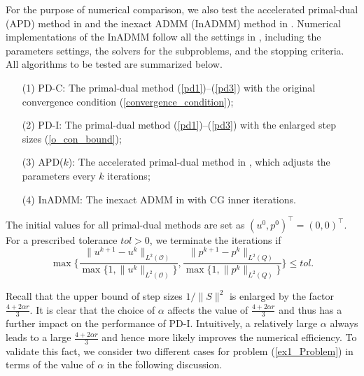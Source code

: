 \documentclass[final]{siamart171218}
\theoremstyle{remark}
\begin{document}
For the purpose of numerical comparison, we also test the accelerated primal-dual (APD) method in \cite{chambolle2011first} and the inexact ADMM (InADMM) method in  \cite{glowinski2022}.
Numerical implementations of the InADMM follow all the settings in \cite{glowinski2022}, including the parameters settings, the solvers for the subproblems, and the stopping criteria. All algorithms to be tested are summarized below.
\begin{enumerate}
	\item [(1)] PD-C: The primal-dual method (\ref{pd1})--(\ref{pd3}) with the original convergence condition (\ref{convergence_condition});
	\item [(2)] PD-I: The primal-dual method (\ref{pd1})--(\ref{pd3}) with the enlarged step sizes (\ref{o_con_bound});
	\item [(3)] {APD($k$)}: The accelerated primal-dual method in \cite{chambolle2011first}, which adjusts the parameters every $k$ iterations;
	\item [(4)] {InADMM}: The inexact ADMM in \cite{glowinski2022} with CG inner iterations.
\end{enumerate}
The initial values for all primal-dual methods are set as $(u^0,p^0)^\top=(0,0)^\top$. For a prescribed tolerance $tol>0$, we terminate the iterations if
\begin{equation}\label{stopping}
	\max\Big\{\frac{\|u^{k+1}-u^k\|_{L^2(\mathcal{O})}}{\max\{1,\|u^k\|_{L^2(\mathcal{O})}\}},\frac{\|p^{k+1}-p^k\|_{L^2(Q)}}{\max\{1,\|p^k\|_{L^2(Q)}\}}\Big\}\leq tol.
\end{equation}

Recall that the upper bound of step sizes $1/\|S\|^2$ is enlarged by the factor $\frac{4+2\alpha r}{3}$. It is clear that the choice of $\alpha$ affects the value of $\frac{4+2\alpha r}{3}$ and thus has a further impact on the performance of PD-I. Intuitively, a relatively large $\alpha$ always leads to a large $\frac{4+2\alpha r}{3}$ and hence more likely improves the numerical efficiency. To validate this fact, we consider two different cases for problem (\ref{ex1_Problem}) in terms of the value of $\alpha$ in the following discussion.
\end{document}
